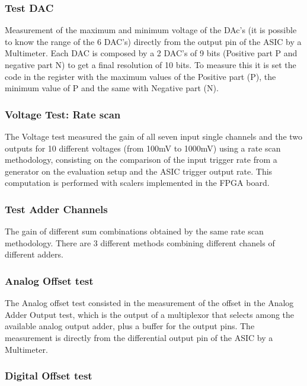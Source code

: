 \documentclass[a4paper,10pt]{book}
\begin{document}
\subsubsection{Test DAC}

Measurement of the maximum and minimum voltage of the DAc's (it is possible to know the range of the 6 DAC's) directly from the output pin
of the ASIC by a Multimeter. Each DAC is composed by a 2 DAC's of 9 bits (Positive part P and negative part N) to get a final resolution of 10 bits. To measure
this it is set the code in the register with the maximum values of the Positive part (P), the minimum value of P and the same with Negative part (N).

\subsubsection{Voltage Test: Rate scan}

The Voltage test measured the gain of all seven input single channels and the two outputs for 10
different voltages (from 100mV to 1000mV) using a rate scan methodology, consisting on the
comparison of the input trigger rate from a generator on the evaluation setup and the ASIC trigger
output rate. This computation is performed with scalers implemented in the FPGA board.

\subsubsection{Test Adder Channels}

The gain of different sum combinations obtained by the same rate scan methodology. There are 3 different methods combining different
chanels of different adders.

\subsubsection{Analog Offset test}
The Analog offset test consisted in the measurement of the offset in the Analog Adder Output test,
which is the output of a multiplexor that selects among the available analog output adder, plus a
buffer for the output pins. The measurement is directly from the differential output pin of the ASIC
by a Multimeter.

\subsubsection{Digital Offset test}
\end{document}
